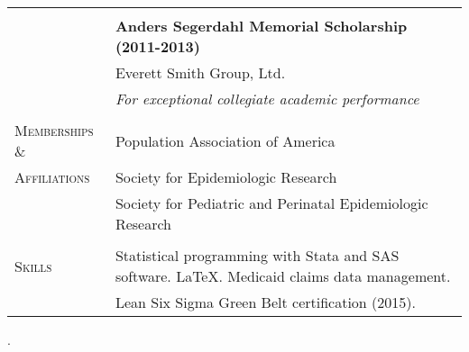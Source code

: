 \documentclass[letterpaper,10pt,oneside]{article}
\begin{document}
\begin{longtable}{@{} p{} p{}}
     & \\
     &\textbf{Anders Segerdahl Memorial Scholarship (2011-2013)} \\
     & Everett Smith Group, Ltd. \\
     & \textit{For exceptional collegiate academic performance} \\
     & \\
\textsc{Memberships \&} & Population Association of America \\
\textsc{Affiliations} & Society for Epidemiologic Research \\
     & Society for Pediatric and Perinatal Epidemiologic Research \\
     & \\
\textsc{Skills} & Statistical programming with Stata and SAS software. \LaTeX. Medicaid claims data management. \\
     & Lean Six Sigma Green Belt certification (2015).\\
\end{longtable}. 
\end{document}
